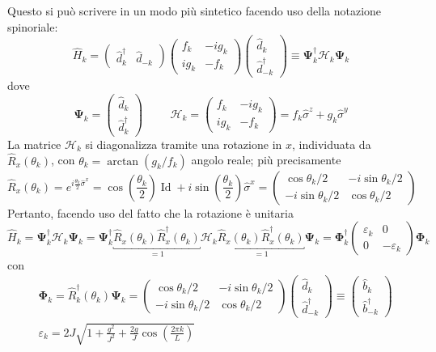 \documentclass[11pt, a4paper]{scrartcl}
\theoremstyle{style}
\theoremstyle{style1}
\numberwithin{equation}{subsection}
\begin{document}
Questo si pu\`o scrivere in un modo pi\`u sintetico facendo uso della notazione spinoriale:
\[
	\hat{H}_k = \begin{pmatrix} \hat{d}^\dagger _k & \hat{d}_{-k}  \end{pmatrix} \begin{pmatrix} f_k & - i g_k \\ i g_k & - f_k \end{pmatrix} \begin{pmatrix} \hat{d}_k \\ \hat{d}^\dagger _{-k}  \end{pmatrix} \equiv \pmb{\Psi} _k^\dagger \mathcal{H} _k \pmb{\Psi} _k
\] 
dove 
\[
	\pmb{\Psi} _k = \begin{pmatrix} \hat{d}_k \\ \hat{d}^\dagger _k \end{pmatrix} \hspace{1cm} \mathcal{H} _k = \begin{pmatrix} f_ k & - i g_k \\ i g_k & - f_k \end{pmatrix} = f_k \hat{\sigma }^z + g_k \hat{\sigma }^y
\] 
La matrice $\mathcal{H} _k$ si diagonalizza tramite una rotazione in $x$, individuata da $\hat{R}_x (\theta _k)$, con $\theta _k = \arctan ( g_k / f_k)$ angolo reale; pi\`u precisamente
\[
	\hat{R}_x (\theta _k) = e^{i \frac{\theta _k}{2}\hat{\sigma }^x} = \cos \left(\frac{\theta _k}{2}\right) \operatorname{Id}  + i \sin \left(\frac{\theta _k}{2}\right) \hat{\sigma }^x = \begin{pmatrix} \cos \theta  _ k / 2 &  - i \sin \theta  _k / 2\\ -i \sin \theta _k / 2 & \cos \theta _k / 2\end{pmatrix} 
\] 
Pertanto, facendo uso del fatto che la rotazione \`e unitaria
\[
	\hat{H}_k = \pmb{\Psi} _k ^\dagger \mathcal{H} _k \pmb{\Psi} _k = \pmb{\Psi} _k^\dagger \underbracket{\hat{R}_x (\theta _k) \hat{R}_x^\dagger (\theta _k)}_{=1} \mathcal{H} _k\underbracket{ \hat{R}_x (\theta _k) \hat{R}^\dagger _x (\theta _k) }_{=1} \pmb{\Psi} _k = \pmb{\Phi} _k^\dagger  \begin{pmatrix} \varepsilon _k & 0 \\ 0 & - \varepsilon _k\end{pmatrix} \pmb{\Phi} _k
\] 
con
\[
	\begin{split}
		&\pmb{\Phi} _k = \hat{R}^\dagger _k (\theta _k) \pmb{\Psi} _k = \begin{pmatrix} \cos \theta  _ k / 2 & - i \sin \theta  _k / 2 \\ - i \sin \theta _k / 2 & \cos \theta _k / 2 \end{pmatrix} \begin{pmatrix} \hat{d}_k \\ \hat{d}^\dagger _{-k}  \end{pmatrix} \equiv \begin{pmatrix} \hat{b}_k \\ \hat{b}^\dagger _{-k}  \end{pmatrix} \\
		& \varepsilon _k = 2 J \sqrt{1 + \frac{g^2}{J^2} + \frac{2g}{J}\cos \left(\frac{2\pi k}{L}\right) }
	\end{split}
\] 
\end{document}
